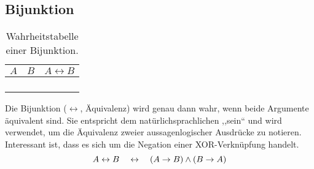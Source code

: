 \subsection{Bijunktion}
%
\begin{table}[ht]
 \begin{center}
  \begin{tabular}{cc|c}
   \hline
    $A$ & $B$ & $A \leftrightarrow{} B$ \\
   \hline \hline
    \F  & \F  & \T \\
    \F  & \T  & \F \\
    \T  & \F  & \F \\
    \T  & \T  & \T \\
  \end{tabular}
  \caption{Wahrheitstabelle einer Bijunktion.}
  \label{fig:bijunction_operator}
 \end{center}
\end{table}
%
Die Bijunktion ($\leftrightarrow$, Äquivalenz) wird genau dann wahr, wenn beide Argumente äquivalent sind. Sie entspricht dem natürlichsprachlichen ,,sein`` und wird verwendet, um die Äquivalenz zweier aussagenlogischer Ausdrücke zu notieren. Interessant ist, dass es sich um die Negation einer XOR-Verknüpfung handelt. %
%
\begin{equation}
  A \leftrightarrow B  \quad\leftrightarrow\quad (A \rightarrow B) \land (B \rightarrow A)
\end{equation}
%
